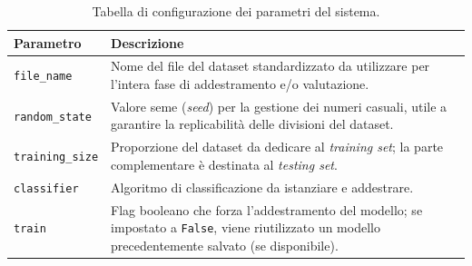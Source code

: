 \begin{table}[h!]
    \centering
    \begin{tabular}{lp{10cm}}
        \hline
        \textbf{Parametro}      & \textbf{Descrizione}                                                                                                                                        \\
        \hline
        \texttt{file\_name}     & Nome del file del dataset standardizzato da utilizzare per l’intera fase di addestramento e/o valutazione.                                                  \\[0.5em]
        \texttt{random\_state}  & Valore seme (\textit{seed}) per la gestione dei numeri casuali, utile a garantire la replicabilità delle divisioni del dataset.                             \\[0.5em]
        \texttt{training\_size} & Proporzione del dataset da dedicare al \textit{training set}; la parte complementare è destinata al \textit{testing set}.                                   \\[0.5em]
        \texttt{classifier}     & Algoritmo di classificazione da istanziare e addestrare.                                                                                                    \\[0.5em]
        \texttt{train}          & Flag booleano che forza l’addestramento del modello; se impostato a \texttt{False}, viene riutilizzato un modello precedentemente salvato (se disponibile). \\
        \hline
    \end{tabular}
    \caption{Tabella di configurazione dei parametri del sistema.}
    \label{tab:parametri-config}
\end{table}

\FloatBarrier

